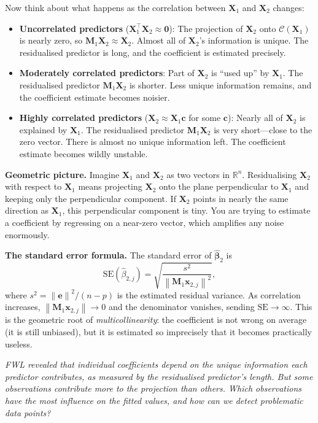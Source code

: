 \documentclass[11pt,a4paper]{article}
\theoremstyle{plain}
\theoremstyle{definition}
\newcommand{\R}{\mathbb{R}}
\newcommand{\bhat}{\hat{\bm{\beta}}}
\newcommand{\bX}{\bm{X}}
\newcommand{\be}{\bm{e}}
\newcommand{\bM}{\bm{M}}
\newcommand{\Col}{\mathcal{C}}
\newcommand{\norm}[1]{\left\lVert #1 \right\rVert}
\begin{document}
Now think about what happens as the correlation between $\bX_1$ and $\bX_2$ changes:
\begin{itemize}[nosep]
  \item \textbf{Uncorrelated predictors} ($\bX_1^\top\bX_2 \approx \bm{0}$):
    The projection of $\bX_2$ onto $\Col(\bX_1)$ is nearly zero, so $\bM_1\bX_2 \approx \bX_2$.
    Almost all of $\bX_2$'s information is unique. The residualised predictor is long, and the coefficient is estimated precisely.
  \item \textbf{Moderately correlated predictors}:
    Part of $\bX_2$ is ``used up'' by $\bX_1$. The residualised predictor $\bM_1\bX_2$ is shorter. Less unique information remains, and the coefficient estimate becomes noisier.
  \item \textbf{Highly correlated predictors} ($\bX_2\approx \bX_1\bm{c}$ for some $\bm{c}$):
    Nearly all of $\bX_2$ is explained by $\bX_1$. The residualised predictor $\bM_1\bX_2$ is very short---close to the zero vector. There is almost no unique information left. The coefficient estimate becomes wildly unstable.
\end{itemize}

\medskip
\noindent\textbf{Geometric picture.}
Imagine $\bX_1$ and $\bX_2$ as two vectors in $\R^n$.
Residualising $\bX_2$ with respect to $\bX_1$ means projecting $\bX_2$ onto the plane perpendicular to $\bX_1$ and keeping only the perpendicular component.
If $\bX_2$ points in nearly the same direction as $\bX_1$, this perpendicular component is tiny.
You are trying to estimate a coefficient by regressing on a near-zero vector, which amplifies any noise enormously.

\medskip
\noindent\textbf{The standard error formula.}
The standard error of $\bhat_2$ is
\[
  \text{SE}(\hat{\beta}_{2,j})
  = \sqrt{\frac{s^2}{\norm{\bM_1\bm{x}_{2,j}}^2}},
\]
where $s^2 = \norm{\be}^2/(n-p)$ is the estimated residual variance.
As correlation increases, $\norm{\bM_1\bm{x}_{2,j}}\to 0$ and the denominator vanishes,
sending $\text{SE}\to\infty$.
This is the geometric root of \emph{multicollinearity}: the coefficient is not wrong on average (it is still unbiased), but it is estimated so imprecisely that it becomes practically useless.

\medskip
\noindent\textit{FWL revealed that individual coefficients depend on
the unique information each predictor contributes, as measured by
the residualised predictor's length.
But some observations contribute more to the projection than others.
Which observations have the most influence on the fitted values,
and how can we detect problematic data points?}


\end{document}
